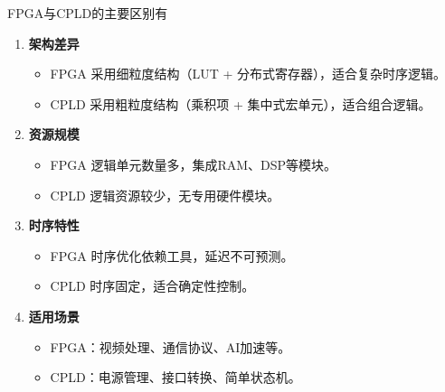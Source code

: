 \begin{frame}{FPGA与CPLD的主要区别有}
\label{fpgaux4e0ecpldux7684ux4e3bux8981ux533aux522bux6709}
\begin{enumerate}
\tightlist
\item
    \textbf{架构差异}

    \begin{itemize}
    \tightlist
    \item
    FPGA 采用细粒度结构（LUT + 分布式寄存器），适合复杂时序逻辑。\\
    \item
    CPLD 采用粗粒度结构（乘积项 + 集中式宏单元），适合组合逻辑。
    \end{itemize}
\item
    \textbf{资源规模}

    \begin{itemize}
    \tightlist
    \item
    FPGA 逻辑单元数量多，集成RAM、DSP等模块。\\
    \item
    CPLD 逻辑资源较少，无专用硬件模块。
    \end{itemize}
\item
    \textbf{时序特性}

    \begin{itemize}
    \tightlist
    \item
    FPGA 时序优化依赖工具，延迟不可预测。\\
    \item
    CPLD 时序固定，适合确定性控制。
    \end{itemize}
\item
    \textbf{适用场景}

    \begin{itemize}
    \tightlist
    \item
    FPGA：视频处理、通信协议、AI加速等。\\
    \item
    CPLD：电源管理、接口转换、简单状态机。
    \end{itemize}
\end{enumerate}
\end{frame}

